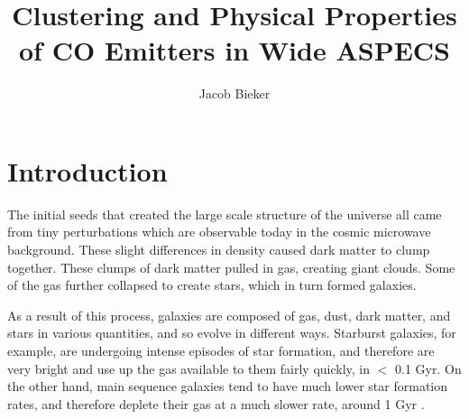 \documentclass[twoside,single]{lion-msc}
\title{Clustering and Physical Properties of CO Emitters in Wide ASPECS}
\author{Jacob Bieker}
\affiliation{Leiden Observatory, Leiden University}
\begin{document}
\maketitle

\setcounter{page}{2}
\tableofcontents
\cleardoublepage

\setcounter{page}{1}
\chapter{Introduction}






The initial seeds that created the large scale structure of the universe all came from tiny perturbations which are observable today in the cosmic microwave background. These slight differences in density caused dark matter to clump together. These clumps of dark matter pulled in gas, creating giant clouds. Some of the gas further collapsed to create stars, which in turn formed galaxies.

As a result of this process, galaxies are composed of gas, dust, dark matter, and stars in various quantities, and so evolve in different ways. Starburst galaxies, for example, are undergoing intense episodes of star formation, and therefore are very bright and use up the gas available to them fairly quickly, in $<$ 0.1 Gyr. On the other hand, main sequence galaxies tend to have much lower star formation rates, and therefore deplete their gas at a much slower rate, around 1 Gyr \cite{scoville2017evolution, silverman2015higher}.
\end{document}
